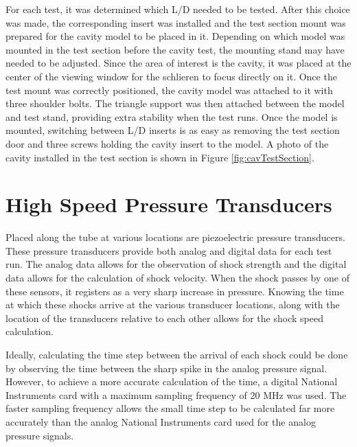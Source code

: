For each test, it was determined which L/D needed to be tested. After this choice was made, the corresponding insert was installed and the test section mount was prepared for the cavity model to be placed in it. Depending on which model was mounted in the test section before the cavity test, the mounting stand may have needed to be adjusted.  Since the area of interest is the cavity, it was placed at the center of the viewing window for the schlieren to focus directly on it. Once the test mount was correctly positioned, the cavity model was attached to it with three shoulder bolts. The triangle support was then attached between the model and test stand, providing extra stability when the test runs. Once the model is mounted, switching between L/D inserts is as easy as removing the test section door and three screws holding the cavity insert to the model. A photo of the cavity installed in the test section is shown in Figure \ref{fig:cavTestSection}.



\section{High Speed Pressure Transducers}

Placed along the tube at various locations are piezoelectric pressure transducers. These pressure transducers provide both analog and digital data for each test run. The analog data allows for the observation of shock strength and the digital data allows for the calculation of shock velocity. When the shock passes by one of these sensors, it registers as a very sharp increase in pressure. Knowing the time at which these shocks arrive at the various transducer locations, along with the location of the transducers relative to each other allows for the shock speed calculation. 

Ideally, calculating the time step between the arrival of each shock could be done by observing the time between the sharp spike in the analog pressure signal. However, to achieve a more accurate calculation of the time, a digital National Instruments card with a maximum sampling frequency of 20 MHz was used. The faster sampling frequency allows the small time step to be calculated far more accurately than the analog National Instruments card used for the analog pressure signals. 


